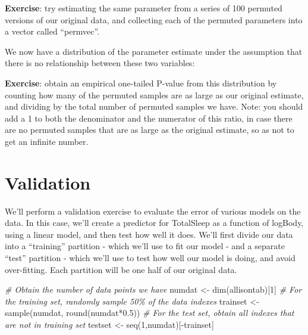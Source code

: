 \documentclass[
]{book}
\newenvironment{Shaded}{\begin{snugshade}}{\end{snugshade}}
\newcommand{\CommentTok}[1]{\textcolor[rgb]{0.56,0.35,0.01}{\textit{#1}}}
\newcommand{\DecValTok}[1]{\textcolor[rgb]{0.00,0.00,0.81}{#1}}
\newcommand{\FloatTok}[1]{\textcolor[rgb]{0.00,0.00,0.81}{#1}}
\newcommand{\FunctionTok}[1]{\textcolor[rgb]{0.00,0.00,0.00}{#1}}
\newcommand{\NormalTok}[1]{#1}
\newcommand{\OtherTok}[1]{\textcolor[rgb]{0.56,0.35,0.01}{#1}}
\newcommand{\SpecialCharTok}[1]{\textcolor[rgb]{0.00,0.00,0.00}{#1}}
\begin{document}
\textbf{Exercise}: try estimating the same parameter from a series of 100 permuted versions of our original data, and collecting each of the permuted parameters into a vector called ``permvec''.

We now have a distribution of the parameter estimate under the assumption that there is no relationship between these two variables:

\textbf{Exercise}: obtain an empirical one-tailed P-value from this distribution by counting how many of the permuted samples are as large as our original estimate, and dividing by the total number of permuted samples we have. Note: you should add a 1 to both the denominator and the numerator of this ratio, in case there are no permuted samples that are as large as the original estimate, so as not to get an infinite number.

\hypertarget{validation}{%
\section{Validation}\label{validation}}

We'll perform a validation exercise to evaluate the error of various models on the data. In this case, we'll create a predictor for TotalSleep as a function of logBody, using a linear model, and then test how well it does. We'll first divide our data into a ``training'' partition - which we'll use to fit our model - and a separate ``test'' partition - which we'll use to test how well our model is doing, and avoid over-fitting. Each partition will be one half of our original data.

\begin{Shaded}
\begin{Highlighting}[]
\CommentTok{\# Obtain the number of data points we have}
\NormalTok{numdat }\OtherTok{\textless{}{-}} \FunctionTok{dim}\NormalTok{(allisontab)[}\DecValTok{1}\NormalTok{]}
\CommentTok{\# For the training set, randomly sample 50\% of the data indexes}
\NormalTok{trainset }\OtherTok{\textless{}{-}} \FunctionTok{sample}\NormalTok{(numdat, }\FunctionTok{round}\NormalTok{(numdat}\SpecialCharTok{*}\FloatTok{0.5}\NormalTok{))}
\CommentTok{\# For the test set, obtain all indexes that are not in training set}
\NormalTok{testset }\OtherTok{\textless{}{-}} \FunctionTok{seq}\NormalTok{(}\DecValTok{1}\NormalTok{,numdat)[}\SpecialCharTok{{-}}\NormalTok{trainset]}
\end{Highlighting}
\end{Shaded}
\end{document}

